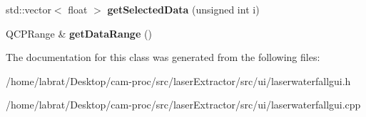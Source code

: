\begin{DoxyCompactItemize}
\item 
std\+::vector$<$ float $>$ {\bfseries get\+Selected\+Data} (unsigned int i)\hypertarget{classLaserWaterfallGui_a5dce966715af6cfb0f3739d327d5df43}{}\label{classLaserWaterfallGui_a5dce966715af6cfb0f3739d327d5df43}

\item 
Q\+C\+P\+Range \& {\bfseries get\+Data\+Range} ()\hypertarget{classLaserWaterfallGui_abb5da79779a84e89f7820ecd9c42a028}{}\label{classLaserWaterfallGui_abb5da79779a84e89f7820ecd9c42a028}

\end{DoxyCompactItemize}


The documentation for this class was generated from the following files\+:\begin{DoxyCompactItemize}
\item 
/home/labrat/\+Desktop/cam-\/proc/src/laser\+Extractor/src/ui/laserwaterfallgui.\+h\item 
/home/labrat/\+Desktop/cam-\/proc/src/laser\+Extractor/src/ui/laserwaterfallgui.\+cpp\end{DoxyCompactItemize}
